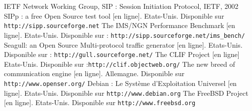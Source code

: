 \renewcommand{\bibname}{Bibliographie}
\renewcommand{\refname}{Bibliographie}

\begin{thebibliography}{Bibliographie}

% 
% 
 IETF Network Working Group, SIP : Session Initiation Protocol, IETF, 2002
 SIPp : a free Open Source test tool [en ligne]. Etats-Unis. Disponible sur \verb|http://sipp.sourceforge.net|
 The IMS/NGN Performance Benchmark [en ligne]. Etats-Unis. Disponible sur : \verb|http://sipp.sourceforge.net/ims_bench/|
 Seagull: an Open Source Multi-protocol traffic generator [en ligne]. Etats-Unis. Disponible sur : \verb|http://gull.sourceforge.net/|
 The CLIF Project [en ligne] Etats-Unis. Disponible sur :\verb|http://clif.objectweb.org/|
 The new breed of communication engine [en ligne]. Allemagne. Disponible sur \verb|http://www.openser.org/|
 Debian : Le Système d'Exploitation Universel [en ligne]. Etats-Unis. Disponible sur \verb|http://www.debian.org|
 The FreeBSD Project [en ligne]. Etats-Unis. Disponible sur \verb|http://www.freebsd.org|
\end{thebibliography}

\pagebreak
